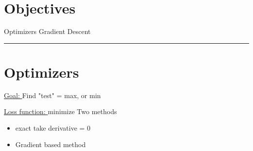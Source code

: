 
\section*{Objectives}
\begin{outline}
    \1 Optimizers
    \1 Gradient Descent
\end{outline}

\rule[0.0051in]{\textwidth}{0.00025in}

\section*{Optimizers}

\underline{Goal: } Find "test" = max, or min

\underline{Loss function: } minimize
Two methods
\begin{itemize}
    \item exact take derivative = 0
    \item  Gradient based method
\end{itemize}




